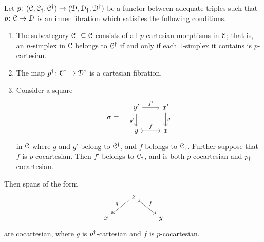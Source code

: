 \documentclass[main.tex]{subfiles}
\begin{document}
\begin{theorem}
  \label{thm:new_barwick}
  Let $p\colon (\mathcal{C}, \mathcal{C}_{\dagger}, \mathcal{C}^{\dagger}) \to (\mathcal{D}, \mathcal{D}_{\dagger}, \mathcal{D}^{\dagger})$ be a functor between adequate triples such that $p\colon \mathcal{C} \to \mathcal{D}$ is an inner fibration which satisfies the following conditions.
  \begin{enumerate}
    \item The subcategory $\mathcal{C}^{\dagger} \subseteq \mathcal{C}$ consists of all $p$-cartesian morphisms in $\mathcal{C}$; that is, an $n$-simplex in $\mathcal{C}$ belongs to $\mathcal{C}^{\dagger}$ if and only if each $1$-simplex it contains is $p$-cartesian.

    \item The map $p^{\dagger}\colon \mathcal{C}^{\dagger} \to \mathcal{D}^{\dagger}$ is a cartesian fibration.

    \item Consider a square
      \begin{equation*}
          \sigma = \quad
          \begin{tikzcd}
            y'
            \arrow[r, "f'"]
            \arrow[d, two heads, swap, "g'"]
            & x'
            \arrow[d, two heads, "g"]
            \\
            y
            \arrow[r, rightarrowtail, "f"]
            & x
          \end{tikzcd}
      \end{equation*}
      in $\mathcal{C}$ where $g$ and $g'$ belong to $\mathcal{C}^{\dagger}$, and $f$ belongs to $\mathcal{C}_{\dagger}$. Further suppose that $f$ is $p$-cocartesian. Then $f'$ belongs to $\mathcal{C}_{\dagger}$, and is both $p$-cocartesian and $p_{\dagger}$-cocartesian.
  \end{enumerate}
  Then spans of the form
  \begin{equation*}
    \begin{tikzcd}
      & z
      \arrow[dl, two heads, swap, "g"]
      \arrow[dr, rightarrowtail, "f"]
      \\
      x
      && y
    \end{tikzcd}
  \end{equation*}
  are cocartesian, where $g$ is $p^{\dagger}$-cartesian and $f$ is $p$-cocartesian.
\end{theorem}
\end{document}

